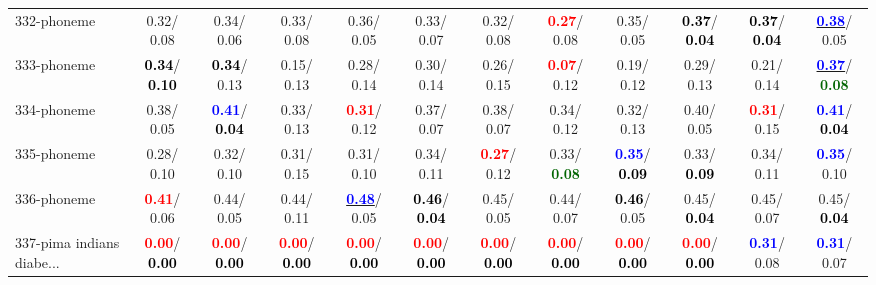 \begin{table}[h]
\begin{center}
{\begin{tabular}{lc|c|c|c|c|c|c|c|c|c|c}
332-phoneme &   0.32/  0.08 &   0.34/  0.06 &   0.33/  0.08 &   0.36/  0.05 &   0.33/  0.07 &   0.32/  0.08 & \textcolor{red}{\textbf{  0.27}}/  0.08 &   0.35/  0.05 & \textcolor{black}{\textbf{  0.37}}/\textcolor{black}{\textbf{  0.04}} & \textcolor{black}{\textbf{  0.37}}/\textcolor{black}{\textbf{  0.04}} & \underline{\textcolor{blue}{\textbf{  0.38}}}/  0.05 \\
333-phoneme & \textcolor{black}{\textbf{  0.34}}/\textcolor{black}{\textbf{  0.10}} & \textcolor{black}{\textbf{  0.34}}/  0.13 &   0.15/  0.13 &   0.28/  0.14 &   0.30/  0.14 &   0.26/  0.15 & \textcolor{red}{\textbf{  0.07}}/  0.12 &   0.19/  0.12 &   0.29/  0.13 &   0.21/  0.14 & \underline{\textcolor{blue}{\textbf{  0.37}}}/\textcolor{darkgreen}{\textbf{  0.08}} \\
334-phoneme &   0.38/  0.05 & \textcolor{blue}{\textbf{  0.41}}/\textcolor{black}{\textbf{  0.04}} &   0.33/  0.13 & \textcolor{red}{\textbf{  0.31}}/  0.12 &   0.37/  0.07 &   0.38/  0.07 &   0.34/  0.12 &   0.32/  0.13 &   0.40/  0.05 & \textcolor{red}{\textbf{  0.31}}/  0.15 & \textcolor{blue}{\textbf{  0.41}}/\textcolor{black}{\textbf{  0.04}} \\ \hline
335-phoneme &   0.28/  0.10 &   0.32/  0.10 &   0.31/  0.15 &   0.31/  0.10 &   0.34/  0.11 & \textcolor{red}{\textbf{  0.27}}/  0.12 &   0.33/\textcolor{darkgreen}{\textbf{  0.08}} & \textcolor{blue}{\textbf{  0.35}}/\textcolor{black}{\textbf{  0.09}} &   0.33/\textcolor{black}{\textbf{  0.09}} &   0.34/  0.11 & \textcolor{blue}{\textbf{  0.35}}/  0.10 \\
336-phoneme & \textcolor{red}{\textbf{  0.41}}/  0.06 &   0.44/  0.05 &   0.44/  0.11 & \underline{\textcolor{blue}{\textbf{  0.48}}}/  0.05 & \textcolor{black}{\textbf{  0.46}}/\textcolor{black}{\textbf{  0.04}} &   0.45/  0.05 &   0.44/  0.07 & \textcolor{black}{\textbf{  0.46}}/  0.05 &   0.45/\textcolor{black}{\textbf{  0.04}} &   0.45/  0.07 &   0.45/\textcolor{black}{\textbf{  0.04}} \\
337-pima indians diabe... & \textcolor{red}{\textbf{  0.00}}/\textcolor{black}{\textbf{  0.00}} & \textcolor{red}{\textbf{  0.00}}/\textcolor{black}{\textbf{  0.00}} & \textcolor{red}{\textbf{  0.00}}/\textcolor{black}{\textbf{  0.00}} & \textcolor{red}{\textbf{  0.00}}/\textcolor{black}{\textbf{  0.00}} & \textcolor{red}{\textbf{  0.00}}/\textcolor{black}{\textbf{  0.00}} & \textcolor{red}{\textbf{  0.00}}/\textcolor{black}{\textbf{  0.00}} & \textcolor{red}{\textbf{  0.00}}/\textcolor{black}{\textbf{  0.00}} & \textcolor{red}{\textbf{  0.00}}/\textcolor{black}{\textbf{  0.00}} & \textcolor{red}{\textbf{  0.00}}/\textcolor{black}{\textbf{  0.00}} & \textcolor{blue}{\textbf{  0.31}}/  0.08 & \textcolor{blue}{\textbf{  0.31}}/  0.07 \\

\end{tabular}}
\end{center}
\end{table}
